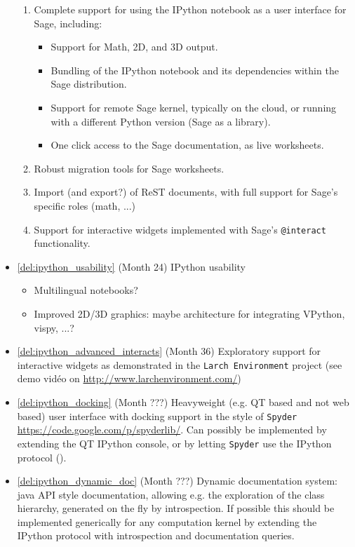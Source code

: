 \begin{Workpackage}{\thewpno}
\begin{WPDeliverables}
\begin{itemize}
    \begin{enumerate}
    \item Complete support for using the IPython notebook as a user
      interface for Sage, including:
      \begin{itemize}
      \item Support for Math, 2D, and 3D output.
      \item Bundling of the IPython notebook and its dependencies within
        the Sage distribution.
      \item Support for remote Sage kernel, typically on the cloud, or
        running with a different Python version (Sage as a library).
      \item One click access to the Sage documentation, as live
        worksheets.
      \end{itemize}
    \item Robust migration tools for Sage worksheets.
    \item Import (and export?)  of ReST documents, with full support for
      Sage's specific roles (math, ...)
    \item Support for interactive widgets implemented with Sage's
      \texttt{@interact} functionality.
    \end{enumerate}
  \item \ref{del:ipython_usability} (Month 24) IPython usability
    \begin{itemize}
    \item Multilingual notebooks?
    \item Improved 2D/3D graphics: maybe architecture for integrating
      VPython, vispy, ...?
    \end{itemize}
  \item \ref{del:ipython_advanced_interacts} (Month 36) Exploratory
    support for interactive widgets as demonstrated in the \texttt{Larch
      Environment} project (see demo vidéo on
    \url{http://www.larchenvironment.com/})
  \item \ref{del:ipython_docking} (Month ???) Heavyweight (e.g. QT
    based and not web based) user interface with docking support in
    the style of \texttt{Spyder}
    \url{https://code.google.com/p/spyderlib/}. Can possibly be
    implemented by extending the QT IPython console, or by letting
    \texttt{Spyder} use the IPython protocol ().
  \item \ref{del:ipython_dynamic_doc} (Month ???) Dynamic
    documentation system: java API style documentation, allowing
    e.g. the exploration of the class hierarchy, generated on the fly
    by introspection.  If possible this should be implemented
    generically for any computation kernel by extending the IPython
    protocol with introspection and documentation queries.


\end{itemize}
\end{WPDeliverables}
\end{Workpackage}
